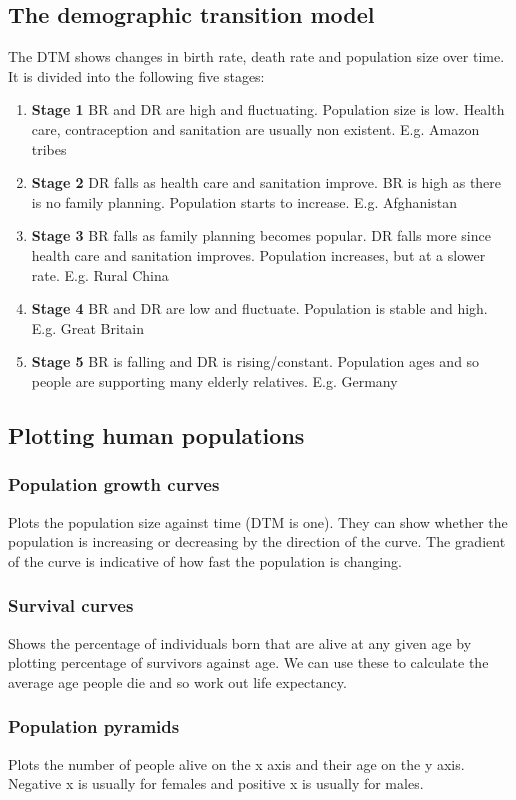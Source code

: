 \documentclass{article}
\begin{document}
\subsection*{The demographic transition model}
The DTM shows changes in birth rate, death rate and population size over time.
It is divided into the following five stages:
\begin{enumerate}
	\item[] \textbf{Stage 1} BR and DR are high and fluctuating. Population size
	is low. Health care, contraception and sanitation are usually non existent.
	E.g. Amazon tribes
	\item[] \textbf{Stage 2} DR falls as health care and sanitation improve. BR
	is high as there is no family planning. Population starts to increase. E.g.
	Afghanistan
	\item[] \textbf{Stage 3} BR falls as family planning becomes popular. DR
	falls more since health care and sanitation improves. Population increases,
	but at a slower rate. E.g. Rural China
	\item[] \textbf{Stage 4} BR and DR are low and fluctuate. Population is
	stable and high. E.g. Great Britain
	\item[] \textbf{Stage 5} BR is falling and DR is rising/constant. Population
	ages and so people are supporting many elderly relatives. E.g. Germany
\end{enumerate}

\subsection*{Plotting human populations}
\subsubsection*{Population growth curves}
Plots the population size against time (DTM is one). They can show whether the
population is increasing or decreasing by the direction of the curve. The
gradient of the curve is indicative of how fast the population is changing.

\subsubsection*{Survival curves}
Shows the percentage of individuals born that are alive at any given age by
plotting percentage of survivors against age. We can use these to calculate
the average age people die and so work out life expectancy.

\subsubsection*{Population pyramids}
Plots the number of people alive on the x axis and their age on the y axis.
Negative x is usually for females and positive x is usually for males.
\end{document}

